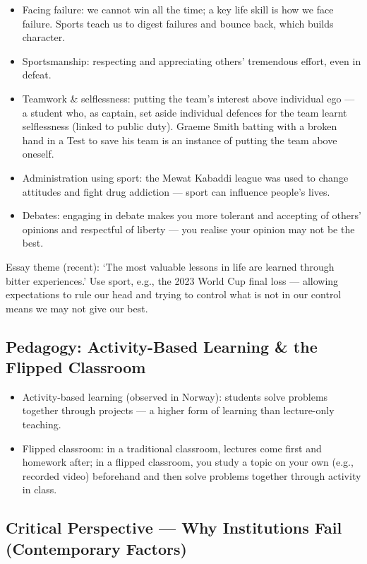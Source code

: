 \begin{itemize}
\item Facing failure: we cannot win all the time; a key life skill is how we face failure. Sports teach us to digest failures and bounce back, which builds character.
\item Sportsmanship: respecting and appreciating others' tremendous effort, even in defeat.
\item Teamwork \& selflessness: putting the team's interest above individual ego --- a student who, as captain, set aside individual defences for the team learnt selflessness (linked to public duty). Graeme Smith batting with a broken hand in a Test to save his team is an instance of putting the team above oneself.
\item Administration using sport: the Mewat Kabaddi league was used to change attitudes and fight drug addiction --- sport can influence people's lives.
\item Debates: engaging in debate makes you more tolerant and accepting of others' opinions and respectful of liberty --- you realise your opinion may not be the best.
\end{itemize}

\begin{PYQLink}
Essay theme (recent): `The most valuable lessons in life are learned through bitter experiences.' Use sport, e.g., the 2023 World Cup final loss --- allowing expectations to rule our head and trying to control what is not in our control means we may not give our best.
\end{PYQLink}

\subsection{Pedagogy: Activity-Based Learning \& the Flipped Classroom}

\begin{itemize}
\item Activity-based learning (observed in Norway): students solve problems together through projects --- a higher form of learning than lecture-only teaching.
\item Flipped classroom: in a traditional classroom, lectures come first and homework after; in a flipped classroom, you study a topic on your own (e.g., recorded video) beforehand and then solve problems together through activity in class.
\end{itemize}

\subsection{Critical Perspective --- Why Institutions Fail (Contemporary Factors)}

